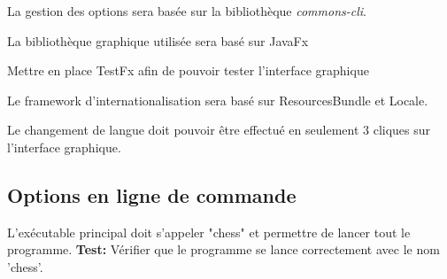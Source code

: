 \documentclass{article}
\begin{document}
\begin{nonfunctionnalneedbox}
    La gestion des options sera basée sur la bibliothèque \textit{commons-cli}.
\end{nonfunctionnalneedbox}

\begin{nonfunctionnalneedbox}
    La bibliothèque graphique utilisée sera basé sur JavaFx
    \begin{subneedbox}
        Mettre en place TestFx afin de pouvoir tester l'interface graphique
    \end{subneedbox}
\end{nonfunctionnalneedbox}

\begin{nonfunctionnalneedbox}
    Le framework d'internationalisation sera basé sur ResourcesBundle et Locale.
    \begin{subneedbox}
        Le changement de langue doit pouvoir être effectué en seulement 3 cliques
        sur l'interface graphique.
    \end{subneedbox}
\end{nonfunctionnalneedbox}

\subsection{Options en ligne de commande}

\begin{nonfunctionnalneedbox}
    L’exécutable principal doit s’appeler "chess" et permettre de lancer tout le programme.
    \textbf{Test:} Vérifier que le programme se lance correctement avec le nom 'chess'.
\end{nonfunctionnalneedbox}
\end{document}
